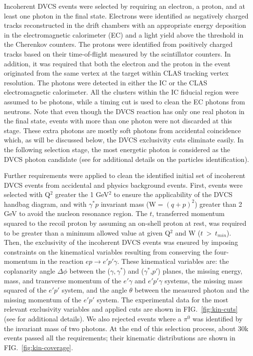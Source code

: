 \documentclass[twocolumn,nofootinbib,showpacs,prl,superscriptaddress,secnumarabic,amssymb,nobibnotes,aps,floatfix]{revtex4}
\begin{document}
Incoherent DVCS events were selected by requiring an electron, a proton, and at 
least one photon in the final state. Electrons were identified as negatively 
charged tracks reconstructed in the drift chambers with an appropriate energy 
deposition in the electromagnetic calorimeter (EC) and a light yield above the 
threshold in the Cherenkov counters. The protons were identified from 
positively charged tracks based on their time-of-flight measured 
by the scintillator counters.  In addition, it was required that both the 
electron and the proton in the event originated from the same vertex at the 
target within CLAS tracking vertex resolution. The photons were detected in 
either the IC or the CLAS electromagnetic calorimeter. All the clusters within 
the IC fiducial region were assumed to be photons, while a timing cut is used 
to clean the EC photons from neutrons. Note that even though the DVCS reaction 
has only one real photon in the final state, events with more than one photon 
were not discarded at this stage. These extra photons are mostly soft photons from accidental 
coincidence which, as will be discussed below, the DVCS exclusivity cuts 
eliminate easily. In the following selection stage, the most energetic photon 
is considered as the DVCS photon candidate (see \cite{Hattawy:thesis} for 
additional details on the particles identification).  

Further requirements were applied to clean the identified initial set of 
incoherent DVCS events from accidental and physics background events. First, 
events were selected with Q$^{2}$ greater the 1 GeV$^2$ to ensure the 
applicability of the DVCS handbag diagram, and with $\gamma^{*}p$ invariant 
mass (W$=(q+p)^2$) greater than 2 GeV to avoid the nucleon resonance region.  
The $t$, transferred momentum squared to the recoil proton by assuming an 
on-shell proton at rest, was required to be greater than a minimum allowed 
value at given Q$^2$ and W ($t~>~t_{min}$).  Then, the exclusivity of the 
incoherent DVCS events was ensured by imposing constraints on the kinematical 
variables resulting from conserving the four-momentum in the reaction 
$ep\rightarrow e'p'\gamma$. These kinematical variables are: the coplanarity 
angle $\Delta\phi$ between the ($\gamma,\gamma^*$) and ($\gamma^*$,$p'$) 
planes, the missing energy, mass, and transverse momentum of the $e'\gamma$ and 
$e'p'\gamma$ systems, the missing mass squared of the $e'p'$ system, and the 
angle $\theta$ between the measured photon and the missing momentum of the 
$e'p'$ system. The experimental data for the most relevant exclusivity 
variables and applied cuts are shown in FIG.~\ref{fig:kin-cuts} (see 
\cite{Hattawy:thesis} for additional details). We also rejected events where a 
$\pi^0$ was identified by the invariant mass of two photons. At the end of
this selection process, about 30k events 
passed all the requirements; their kinematic distributions are shown in 
FIG.~\ref{fig:kin-coverage}.  
\end{document}
